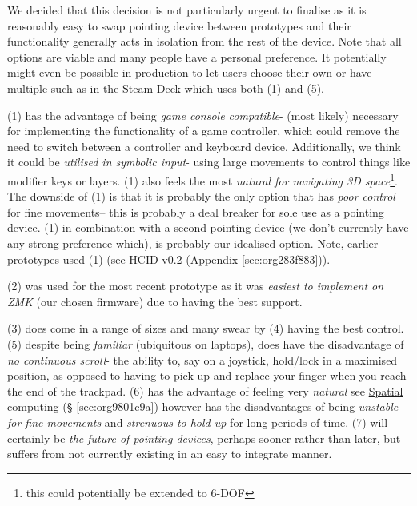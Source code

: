 \documentclass[logo,bsc,singlespacing,parskip]{infthesis}
\begin{document}
We decided that this decision is not particularly urgent to finalise as it is reasonably easy to swap pointing device between prototypes and their functionality generally acts in isolation from the rest of the device.
Note that all options are viable and many people have a personal preference.
It potentially might even be possible in production to let users choose their own or have multiple such as in the Steam Deck \autocite{SteamDeck2022}  which uses both (1) and (5).

(1) has the advantage of being \emph{game console compatible}- (most likely) necessary for implementing the functionality of a game controller, which could remove the need to switch between a controller and keyboard device.
Additionally, we think it could be \emph{utilised in symbolic input}- using large movements to control things like modifier keys or layers.
(1) also feels the most \emph{natural for navigating 3D space}\footnote{this could potentially be extended to 6-DOF}.
The downside of (1) is that it is probably the only option that has \emph{poor control} for fine movements-- this is probably a deal breaker for sole use as a pointing device.
(1) in combination with a second pointing device (we don't currently have any strong preference which), is probably our idealised option.
Note, earlier prototypes used (1) (see \hyperref[sec:org283f883]{HCID v0.2} (Appendix \ref{sec:org283f883})).

(2) was used for the most recent prototype as it was \emph{easiest to implement on ZMK} (our chosen firmware) due to having the best support.

(3) does come in a range of sizes and many swear by (4) having the best control.
(5) despite being \emph{familiar} (ubiquitous on laptops), does have the disadvantage of \emph{no continuous scroll}- the ability to, say on a joystick, hold/lock in a maximised position, as opposed to having to pick up and replace your finger when you reach the end of the trackpad.
(6) has the advantage of feeling very \emph{natural} see \hyperref[sec:org9801c9a]{Spatial computing} (§ \ref{sec:org9801c9a}) however has the disadvantages of being \emph{unstable for fine movements} and \emph{strenuous to hold up} for long periods of time.
(7) will certainly be \emph{the future of pointing devices}, perhaps sooner rather than later, but suffers from not currently existing in an easy to integrate manner.
\end{document}
